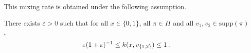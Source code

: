 This mixing rate is obtained under the following assumption.
\begin{hypH}
\label{assum:strongmix}
There exists $\varepsilon>0$ such that for all $x\in\{0,1\}$, all $\pi\in\Pi$ and all $v_1,v_2 \in \mathrm{supp}(\pi)$ , 
\begin{equation}
\label{eq:bound:likelihood}
\varepsilon(1+\varepsilon)^{-1}\le k(x,v_{\{1,2\}})\le 1\,.
\end{equation}
\end{hypH}

